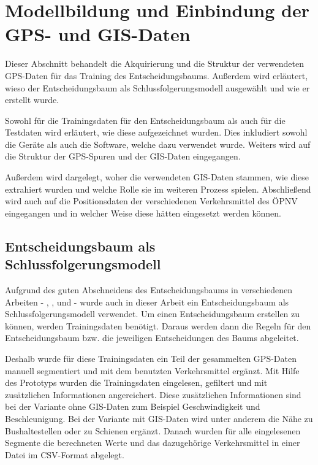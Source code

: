 \chapter{Modellbildung und Einbindung der GPS- und GIS-Daten}
Dieser Abschnitt behandelt die Akquirierung und die Struktur der verwendeten GPS-Daten für das Training des Entscheidungsbaums. Außerdem wird erläutert, wieso der Entscheidungsbaum als Schlussfolgerungsmodell ausgewählt und wie er erstellt wurde. 

Sowohl für die Trainingsdaten für den Entscheidungsbaum als auch für die Testdaten wird erläutert, wie diese aufgezeichnet wurden. Dies inkludiert sowohl die Geräte als auch die Software, welche dazu verwendet wurde. Weiters wird auf die Struktur der GPS-Spuren und der GIS-Daten eingegangen.

Außerdem wird dargelegt, woher die verwendeten GIS-Daten stammen, wie diese extrahiert wurden und welche Rolle sie im weiteren Prozess spielen. Abschließend wird auch auf die Positionsdaten der verschiedenen Verkehrsmittel des ÖPNV eingegangen und in welcher Weise diese hätten eingesetzt werden können.
\clearpage

\section{Entscheidungsbaum als Schlussfolgerungsmodell}
\label{entscheidungsbaumAlsSchlussfolgerungsmodell}
Aufgrund des guten Abschneidens des Entscheidungsbaums in verschiedenen Arbeiten  - \cite{stenneth_transportation_2011}, \cite{reddy_using_2010}, \cite{sebastian_nagel_moglichkeitsstudie_2011}und \cite{zheng_learning_2008} -  wurde auch in dieser Arbeit ein Entscheidungsbaum als Schlussfolgerungsmodell verwendet. Um einen Entscheidungsbaum erstellen zu können, werden Trainingsdaten benötigt. Daraus werden dann die Regeln für den Entscheidungsbaum bzw. die jeweiligen Entscheidungen des Baums abgeleitet.

Deshalb wurde für diese Trainingsdaten ein Teil der gesammelten GPS-Daten manuell segmentiert und mit dem benutzten Verkehrsmittel ergänzt. Mit Hilfe des Prototyps wurden die Trainingsdaten eingelesen, gefiltert und mit zusätzlichen Informationen angereichert. Diese zusätzlichen Informationen sind bei der Variante ohne GIS-Daten zum Beispiel Geschwindigkeit und Beschleunigung. Bei der Variante mit GIS-Daten wird unter anderem die Nähe zu Bushaltestellen oder zu Schienen ergänzt. Danach wurden für alle eingelesenen Segmente die berechneten Werte und das dazugehörige Verkehrsmittel in einer Datei im CSV-Format abgelegt. 


